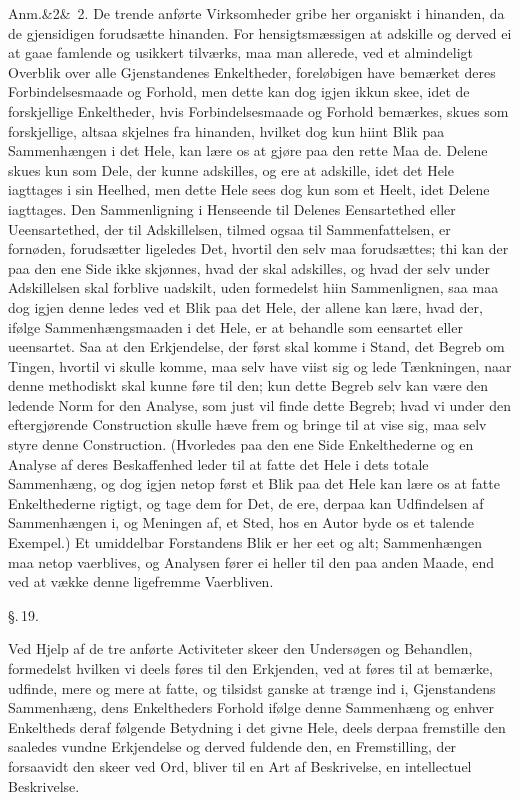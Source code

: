 \documentclass[12pt]{book}
\makeatletter
\def\sperr#1{#1}%
\def\textit#1{#1}%
\def\emph#1{#1}%
\newcommand{\sperr}[1]{\textls[180]{#1}}
\newcommand{\umph}[2][misc]{%
  \@ifundefined{umph@#1@on}{#2}{\emph{#2}}}
\newcommand{\parag}[1]{%
  \par\vspace{0.9\baselineskip}%
  {\centering\textit{\S.\,#1.}\par}%
  \vspace{0.35\baselineskip}%
  \noindent\hspace{\parindent}\ignorespaces
}
\newcommand{\anm}[1]{%
  \par\vspace{0.5\baselineskip}%
  \noindent\hspace{\parindent}\sperr{Anm.}\ifx&#1&\else~\textit{#1}.\fi
  \enspace\ignorespaces
}
\newcommand{\opage}[1]{\marginnote{\footnotesize\textit{[#1]}}}
\makeatother
\begin{document}
\anm{2} De trende anførte Virksomheder gribe her organiskt i hinanden, da de
gjensidigen forudsætte hinanden. For hensigtsmæssigen at adskille og derved ei
at gaae famlende og usikkert tilværks, maa man allerede, ved et almindeligt
Overblik over alle Gjenstandenes Enkeltheder, foreløbigen have bemærket deres
Forbindelsesmaade og Forhold, men dette kan dog igjen ikkun skee, idet de
forskjellige Enkeltheder, hvis Forbindelsesmaade og Forhold bemærkes, skues som
forskjellige, altsaa skjelnes fra hinanden, hvilket dog kun hiint Blik paa
Sammenhængen i det Hele, kan lære os at gjøre paa den rette Maa%
\opage{58}de. Delene skues kun som Dele, der kunne adskilles, og ere at adskille, idet
det Hele iagttages i sin Heelhed, men dette Hele sees dog kun som et Heelt,
idet Delene iagttages. Den Sammenligning i Henseende til Delenes Eensartethed
eller Ueensartethed, der til Adskillelsen, tilmed ogsaa til Sammenfattelsen, er
fornøden, forudsætter ligeledes Det, hvortil den selv maa forudsættes; thi kan
der paa den ene Side ikke skjønnes, hvad der skal adskilles, og hvad der selv
under Adskillelsen skal forblive uadskilt, uden formedelst hiin Sammenlignen,
saa maa dog igjen denne ledes ved et Blik paa det Hele, der allene kan lære,
hvad der, ifølge Sammenhængsmaaden i det Hele, er at behandle som eensartet
eller ueensartet. Saa at den Erkjendelse, der først skal komme i Stand, det
Begreb om Tingen, hvortil vi skulle komme, maa selv have viist sig og lede
Tænkningen, naar denne methodiskt skal kunne føre til den; kun dette Begreb
selv kan være den ledende Norm for den Analyse, som just vil finde dette
Begreb; hvad vi under den eftergjørende Construction skulle hæve frem og bringe
til at vise sig, maa selv styre denne Construction. (Hvorledes paa den ene Side
Enkelthederne og en Analyse af deres Beskaffenhed leder til at fatte det Hele i
dets totale Sammenhæng, og dog igjen netop først et Blik paa det Hele kan lære
os at fatte Enkelthederne rigtigt, og tage dem for Det, de ere, derpaa kan
Udfindelsen af Sammenhængen i,
\opage{59} og Meningen af, et Sted, hos en Autor byde os et talende Exempel.) Et
umiddelbar Forstandens Blik er her eet og alt; Sammenhængen maa netop
vaerblives, og Analysen fører ei heller til den paa anden Maade, end ved at
vække denne ligefremme Vaerbliven.

\parag{19}

Ved Hjelp af de tre anførte Activiteter skeer den Undersøgen og Behandlen,
formedelst hvilken vi deels føres til den \umph[schwab]{intellectuelle} Erkjenden, ved at
føres til at bemærke, udfinde, mere og mere at fatte, og tilsidst ganske at
trænge ind i, Gjenstandens Sammenhæng, dens Enkeltheders Forhold ifølge denne
Sammenhæng og enhver Enkeltheds deraf følgende Betydning i det givne Hele, deels
derpaa fremstille den saaledes vundne Erkjendelse og derved fuldende den, en
Fremstilling, der forsaavidt den skeer ved Ord, bliver til en Art af
Beskrivelse, \emph{en intellectuel Beskrivelse}.
\end{document}
